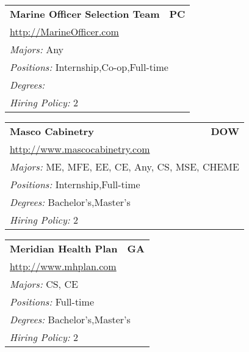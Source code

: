 \documentclass[twoside]{article}
\begin{document}
\begin{center}
\begin{multicols}{3}
\begin{FlushLeft}
\begin{minipage}{.9\columnwidth}
\end{minipage}
 
\begin{minipage}{.9\columnwidth}\begin{tabularx}{.95\columnwidth}{Xr}
                 {\Large\bf Marine Officer Selection Team} & {\Large\bf PC}\\
    \multicolumn{2}{p{.95\columnwidth}}{\url{http://MarineOfficer.com}}\\
    \multicolumn{2}{p{.95\columnwidth}}{\emph{Majors:} Any}\\
    \multicolumn{2}{p{.95\columnwidth}}{\emph{Positions:} Internship,Co-op,Full-time}\\
    \multicolumn{2}{p{.95\columnwidth}}{\emph{Degrees:} }\\
    \multicolumn{2}{p{.95\columnwidth}}{\emph{Hiring Policy:} 2}\\
    \end{tabularx}
    
\end{minipage}
 
\begin{minipage}{.9\columnwidth}\begin{tabularx}{.95\columnwidth}{Xr}
                 {\Large\bf Masco Cabinetry} & {\Large\bf DOW}\\
    \multicolumn{2}{p{.95\columnwidth}}{\url{http://www.mascocabinetry.com}}\\
    \multicolumn{2}{p{.95\columnwidth}}{\emph{Majors:} ME, MFE, EE, CE, Any, CS, MSE, CHEME}\\
    \multicolumn{2}{p{.95\columnwidth}}{\emph{Positions:} Internship,Full-time}\\
    \multicolumn{2}{p{.95\columnwidth}}{\emph{Degrees:} Bachelor's,Master's}\\
    \multicolumn{2}{p{.95\columnwidth}}{\emph{Hiring Policy:} 2}\\
    \end{tabularx}
    
\end{minipage}
 
\begin{minipage}{.9\columnwidth}\begin{tabularx}{.95\columnwidth}{Xr}
                 {\Large\bf Meridian Health Plan} & {\Large\bf GA}\\
    \multicolumn{2}{p{.95\columnwidth}}{\url{http://www.mhplan.com}}\\
    \multicolumn{2}{p{.95\columnwidth}}{\emph{Majors:} CS, CE}\\
    \multicolumn{2}{p{.95\columnwidth}}{\emph{Positions:} Full-time}\\
    \multicolumn{2}{p{.95\columnwidth}}{\emph{Degrees:} Bachelor's,Master's}\\
    \multicolumn{2}{p{.95\columnwidth}}{\emph{Hiring Policy:} 2}\\
    \end{tabularx}
    

\end{minipage}
\end{FlushLeft}
\end{multicols}
\end{center}
\end{document}
